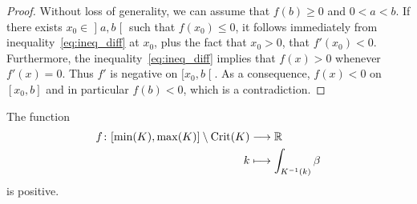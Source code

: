 \documentclass[AHL,Unicode,longabstracts]{cedram}
\DeclareMathOperator{\Crit}{Crit}
\newcommand{\bbR}{\mathbb{R}}
\renewcommand*{\to}{\mathchoice{\longrightarrow}{\rightarrow}{\rightarrow}{\rightarrow}}
\let\oldmapsto\mapsto
\renewcommand*{\mapsto}{\mathchoice{\longmapsto}{\oldmapsto}{\oldmapsto}{\oldmapsto}}
\begin{document}
\begin{proof}
Without loss of generality, we can assume that $f(b) \geq 0$ and $0 < a < b$. If there exists $x_0 \in\mathopen{]}a,b\mathclose{[}$ such that $f(x_0) \leq 0$, it follows immediately from inequality~\eqref{eq:ineq_diff} at $x_0$, plus the fact that $x_0 > 0$, that $f'(x_0) < 0$. Furthermore, the inequality~\eqref{eq:ineq_diff} implies that $f(x) > 0$ whenever $f'(x) = 0$. Thus $f'$ is negative on $[x_0,b\mathclose{[}$. As a consequence, $f(x) < 0$ on $[x_0, b]$ and in particular $f(b) < 0$, which is a contradiction.
\end{proof}


\begin{lemm}\label{lemma:int_ligne_niveau_positive}
The function
\begin{align*}
f  \colon [\min(K), \max(K)] \setminus \Crit(K) &\to \bbR \\
k & \mapsto \int_{K^{-1}(k)}\beta
\end{align*}
is positive.
\end{lemm}
\end{document}
